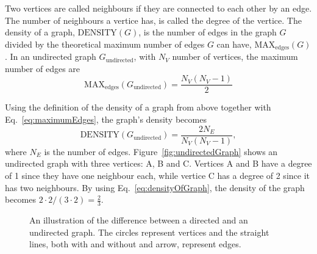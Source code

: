 Two vertices are called neighbours if they are connected to each other by an edge. The number of neighbours a vertice has, is called the degree of the vertice. The density of a graph, $\mathrm{DENSITY}(G)$, is the number of edges in the graph $G$ divided by the theoretical maximum number of edges $G$ can have, $\mathrm{MAX}_\mathrm{edges}(G)$. In an undirected graph $G_\mathrm{undirected}$, with $N_V$ number of vertices, the maximum number of edges are
\begin{equation}\label{eq:maximumEdges}
\mathrm{MAX}_\mathrm{edges}(G_\mathrm{undirected}) = \frac{N_V(N_V-1)}{2}
\end{equation}

Using the definition of the density of a graph from above together with Eq.~\eqref{eq:maximumEdges}, the graph's density becomes
\begin{equation}\label{eq:densityOfGraph}
\mathrm{DENSITY}(G_\mathrm{undirected}) = \frac{2 N_E}{N_V(N_V-1)},
\end{equation}
where $N_E$ is the number of edges. Figure~\ref{fig:undirectedGraph} shows an undirected graph with three vertices: A, B and C. Vertices A and B have a degree of 1 since they have one neighbour each, while vertice C has a degree of 2 since it has two neighbours. By using Eq.~\eqref{eq:densityOfGraph}, the density of the graph becomes $2\cdot2 / (3\cdot2) = \frac{2}{3}$.

\begin{figure}[htbp]
    \centering
    \hfill
    \hfill
    \hfill
    \caption[The difference between a directed and an undirected graph.]{An illustration of the difference between  a directed and  an undirected graph. The circles represent vertices and the straight lines, both with and without and arrow, represent edges.}
    \label{fig:graph}
\end{figure}

\acresetall
